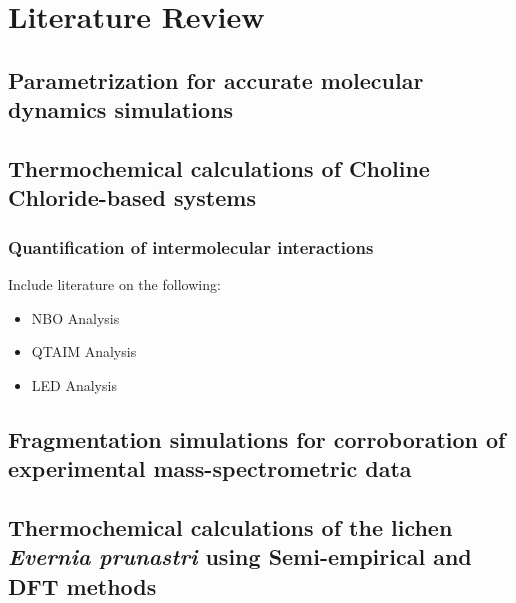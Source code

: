 \section{Literature Review}
\label{sec:lit_review}
\subsection{Parametrization for accurate molecular dynamics simulations}

\subsection{Thermochemical calculations of Choline Chloride-based systems}
\subsubsection{Quantification of intermolecular interactions}
Include literature on the following:
\begin{itemize}
    \item NBO Analysis
    \item QTAIM Analysis
    \item LED Analysis
\end{itemize}

\subsection{Fragmentation simulations for corroboration of experimental mass-spectrometric data}

\subsection{Thermochemical calculations of the lichen \textit{Evernia prunastri} using Semi-empirical and DFT methods}

